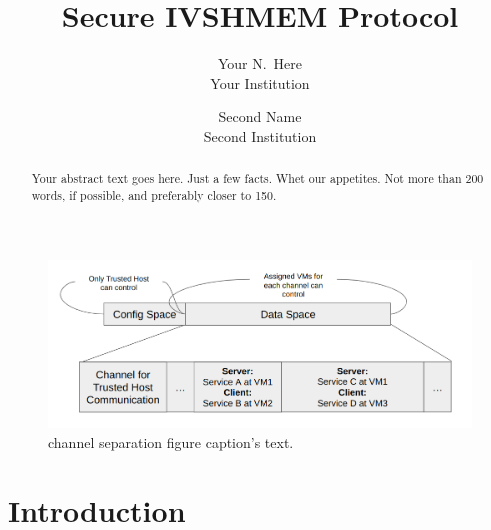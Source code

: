 \documentclass[letterpaper,twocolumn,10pt]{article}
\begin{document}

\date{}

\title{\Large \bf Secure IVSHMEM Protocol}

\author{
{\rm Your N.\ Here}\\
Your Institution
\and
{\rm Second Name}\\
Second Institution
} %

\maketitle




\begin{figure}[ht]
\begin{center}
  \includegraphics[width=\textwidth]{./figures/channel_separation.png}
\end{center}
\caption{\label{fig:channel_separation} channel separation figure 
  caption's text. }
\end{figure}

\begin{abstract}
Your abstract text goes here. Just a few facts. Whet our appetites.
Not more than 200 words, if possible, and preferably closer to 150.
\end{abstract}


\section{Introduction}
\end{document}
